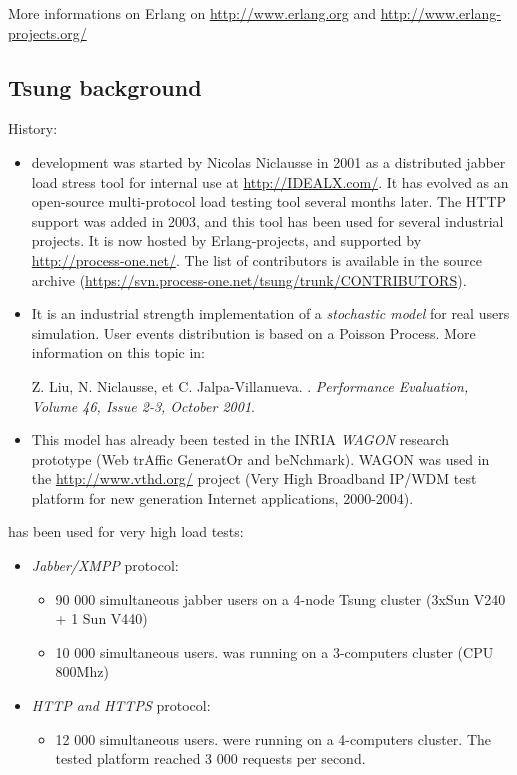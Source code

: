 \documentclass{IDXDOC-en}
\begin{document}
More informations on Erlang on \url{http://www.erlang.org} and
\url{http://www.erlang-projects.org/}


\subsection{Tsung background}

History:
\begin{itemize}
\item {} development was started by Nicolas Niclausse in
  2001 as a distributed jabber load stress tool for internal use at
  \url{http://IDEALX.com/}.  It has evolved as an open-source
  multi-protocol load testing tool several months later. The HTTP
  support was added in 2003, and this tool has been used for several
  industrial projects.  It is now hosted by Erlang-projects, and
  supported by \url{http://process-one.net/}. The list of contributors
  is available in the source archive
  (\url{https://svn.process-one.net/tsung/trunk/CONTRIBUTORS}).

\item It is an industrial strength implementation of a \emph{stochastic model}
for real users simulation. User events distribution is based on a
Poisson Process. More information on this topic in:

Z. Liu, N. Niclausse, et C. Jalpa-Villanueva.  . \emph{Performance Evaluation,
Volume 46, Issue 2-3, October 2001}.

\item This model has already been tested in the INRIA \emph{WAGON}
  research prototype (Web trAffic GeneratOr and beNchmark). WAGON was
  used in the \url{http://www.vthd.org/} project (Very High Broadband
  IP/WDM test platform for new generation Internet applications, 2000-2004).

\end{itemize}

 has been used for very high load tests:

\begin{itemize}
\item \emph{Jabber/XMPP} protocol:
  \begin{itemize}
  \item 90 000 simultaneous jabber users on a
  4-node Tsung cluster (3xSun V240 + 1 Sun V440)
\item 10 000 simultaneous users.
   was running on a 3-computers cluster (CPU
  800Mhz)
  \end{itemize}
\item \emph{HTTP and HTTPS} protocol:
  \begin{itemize}
  \item 12 000 simultaneous users.
   were running on a 4-computers cluster. The
  tested platform reached 3 000 requests per second.
  \end{itemize}
\end{itemize}
\end{document}
